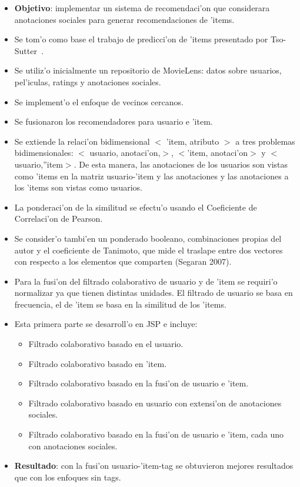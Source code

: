 \documentclass[11pt]{article}
\begin{document}
\begin{itemize}
\item \textbf{Objetivo}: implementar un sistema de recomendaci'on que considerara anotaciones sociales para generar recomendaciones de 'items.
\item Se tom'o como base el trabajo de predicci'on de 'items presentado por \linebreak Tso-Sutter~\cite{tagaware:tso}.
\item Se utiliz'o inicialmente un repositorio de MovieLens: datos sobre usuarios, pel'iculas, ratings y anotaciones sociales.
\item Se implement'o el enfoque de vecinos cercanos.
\item Se fusionaron los recomendadores para usuario e 'item.
\item Se extiende la relaci'on bidimensional $<$ 'item, atributo $>$ a tres problemas bidimensionales: $<$ usuario, anotaci'on,$>$, $<$'item, anotaci'on$>$ y $<$usuario,''item$>$. De esta manera, las anotaciones de los usuarios son vistas como 'items en la matriz usuario-'item y las anotaciones y las anotaciones a los 'items son vistas como usuarios.
\item La ponderaci'on de la similitud se efectu'o usando el Coeficiente de Correlaci'on de Pearson.
\item Se consider'o tambi'en un ponderado booleano, combinaciones propias del autor y el coeficiente de Tanimoto, que mide el traslape entre dos vectores con respecto a los elementos que comparten (Segaran 2007).
\item Para la fusi'on del filtrado colaborativo de usuario y de 'item se requiri'o normalizar ya que tienen distintas unidades. El filtrado de usuario se basa en frecuencia, el de 'item se basa en la similitud de los 'items.
\item Esta primera parte se desarroll'o en JSP e incluye:
\begin{itemize}
\item Filtrado colaborativo basado en el usuario.
\item Filtrado colaborativo basado en 'item.
\item Filtrado colaborativo basado en la fusi'on de usuario e 'item.
\item Filtrado colaborativo basado en usuario con extensi'on de anotaciones sociales.
\item Filtrado colaborativo basado en la fusi'on de usuario e 'item, cada uno con anotaciones sociales.
\end{itemize}
\item \textbf{Resultado}: con la fusi'on usuario-'item-tag se obtuvieron mejores resultados que con los enfoques sin tags.
\end{itemize}
\end{document}
